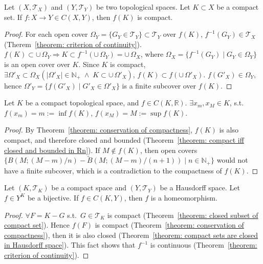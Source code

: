 \documentclass[openany]{book}
\begin{document}
\begin{theorem}
	\label{theorem: conservation of compactness}
Let $(X, \mathscr T_X)$ and $(Y, \mathscr T_Y)$ be two topological spaces. 
Let $K \subset X$ be a compact set. 
If $f \colon X \to Y \in C(X, Y)$, then $f(K)$ is compact.
\end{theorem}
\begin{proof}
For each open cover $\Omega_Y = \{ G_Y \in \mathscr T_Y\} \subset \mathscr T_Y$ over $f( K)$, $f^{-1} ( G_Y) \in \mathscr T_X$ (Therem~\ref{theorem: criterion of continuity}). $f( K) \subset \cup\,\Omega_Y \Rightarrow K \subset f^{-1} \left(  \cup\,\Omega_Y \right) = \cup\,\Omega_X $, where $\Omega_X = \{ f^{-1} ( G_Y) \mid G_Y \in \Omega_Y\} $ is an open cover over $K$. Since $K$ is compact,
$\exists \Omega'_X \subset \Omega_X\left( 
\lvert \Omega'_X \rvert \in \mathbb{N}_+ 
\;\wedge\;K\subset \cup\,\Omega'_X
\right)$, $f( K) \subset f ( \cup\,\Omega'_X) $. $f ( G'_X) \in \Omega_Y$, hence $\Omega'_Y = \{ f ( G'_X) \mid G'_X \in \Omega'_X\}$ is a finite subcover over $f( K)$.
\end{proof}


\begin{theorem}
\label{theorem: Weierstrass maximum-value}
Let $K$ be a compact topological space, and $f \in C (K, \mathbb R)$.
$\exists x_m, x_M \in K$, s.t.\ $f(x_m) = m := \inf f(K)$, $f(x_M) = M := \sup f(K)$.
\end{theorem}
\begin{proof}
By Theorem~\ref{theorem: conservation of compactness}, $f(K)$ is also compact, and therefore closed and bounded (Theorem~\ref{theorem: compact iff closed and bounded in Rn}). 
If $M \notin f(K)$, then open covers $\{ B(M; (M-m)/n) - \tilde B(M; (M-m)/(n + 1)) \mid  n \in \mathbb N_+\} $ would not have a finite subcover, which is a contradiction to the compactness of $f(K)$.
\end{proof}

\begin{theorem}
	\label{theorem: bijective from compact space to Hausdorff space is homeomorphism}
Let $(K, \mathscr T_K)$ be a compact space and $(Y, \mathscr T_Y)$ be a Hausdorff space. 
Let $f \in Y^K$ be a bijective.
If $f \in C(K, Y)$, then $f$ is a homeomorphism.
\end{theorem}
\begin{proof}
$\forall F = K - G$ s.t.\ $G \in \mathscr T_K$ is compact (Theorem~\ref{theorem: closed subset of compact set}). 
Hence $f(F)$ is compact (Theorem~\ref{theorem: conservation of compactness}), then it is also closed
(Theorem~\ref{theorem: compact sets are closed in Hausdorff space}). 
This fact shows that $f^{-1}$ is continuous (Theorem~\ref{theorem: criterion of continuity}).
\end{proof}
\end{document}
